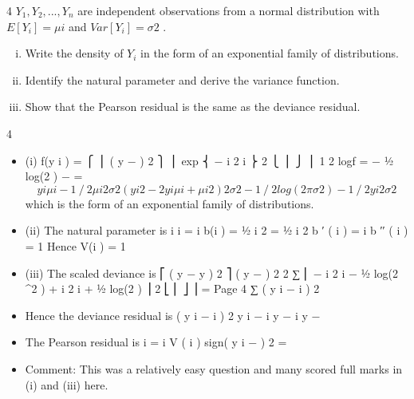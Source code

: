 \documentclass[a4paper,12pt]{article}
\begin{document}
4
$Y_1 , Y_2 , ..., Y_n$ are independent observations from a normal distribution with $E[Y_i ] = \mu i$
and $Var[Y_i] = \sigma 2$ .
\begin{enumerate}[(i)]
\item  Write the density of $Y_i$ in the form of an exponential family of distributions. 
\item Identify the natural parameter and derive the variance function.
\item Show that the Pearson residual is the same as the deviance residual.
\end{enumerate}
4
\begin{itemize}
\item (i)
f(y i ) =
⎧ ⎪ ( y − \mu ) 2 ⎫ ⎪
exp ⎨ − i 2 i ⎬
2  \pi{}
⎩ ⎪
⎭ ⎪
1
2
logf = − 1⁄2 log(2 \pi\sigma ) −
=
\[y i \mu i − 1⁄2 \mu i 2
\sigma 2
( y i 2 − 2 y i \mu i + \mu i 2 )
2 \sigma 2
− 1⁄2 log(2 \pi\sigma 2 ) − 1⁄2
y i 2
\sigma 2\]
which is the form of an exponential family of distributions.
\item (ii)
The natural parameter is \mu i
\theta i = \mu i
b(\theta i ) = 1⁄2 \mu i 2 = 1⁄2 \theta i 2
b ′ ( \theta i ) = \theta i
b ′′ ( \theta i ) = 1
Hence V(\mu i ) = 1
\item (iii)
The scaled deviance is
⎡ ( y − y ) 2
⎤
( y − \hat{\mu} ) 2
2 ∑ ⎢ − i 2 i − 1⁄2 log(2 \pi\sigma^2 ) + i 2 i + 1⁄2 log(2 \pi{} ) ⎥
2  \sigma
⎣ ⎢
⎦ ⎥
=
Page 4
∑
( y i − \hat{\mu} i ) 2
\item 
Hence the deviance residual is
( y i − \hat{\mu} i ) 2
y i − \hat{\mu} i
\sigma
\sigma
y − \hat{\mu} i
y − \hat{\mu}

\item The Pearson residual is i
= i
\sigma V ( \hat{\mu} i )
\sigma
sign( y i − \hat{\mu} )
2
=

\item Comment: This was a relatively easy question and many scored full marks in (i) and
(iii) here.
\end{itemize}
\end{document}
